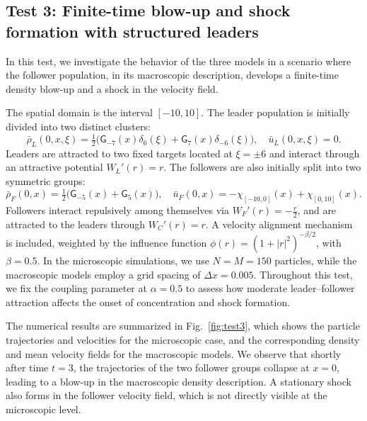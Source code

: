 \documentclass[10pt, reqno]{amsart}
\theoremstyle{definition}
\theoremstyle{remark}
\numberwithin{equation}{section}
\begin{document}
\subsection{Test 3: Finite-time blow-up and shock formation with structured leaders} 

In this test, we investigate the behavior of the three models in a scenario where the follower population, in its macroscopic description, develops a finite-time density blow-up and a shock in the velocity field.

The spatial domain is the interval $[-10, 10]$. The leader population is initially divided into two distinct clusters:
\[
\bar \rho_L(0,x,\xi) = \tfrac{1}{2}\Big(\mathsf{G}_{-7}(x)\delta_6(\xi) + \mathsf{G}_{7}(x)\delta_{-6}(\xi)\Big),
\quad
\bar u_L(0,x,\xi) = 0.
\]  Leaders are attracted to two fixed targets located at $\xi = \pm 6$ and interact through an attractive potential $W_L'(r) = r$. The followers are also initially split into two symmetric groups:
\[
\bar \rho_F(0,x) = \tfrac{1}{2}\Big(\mathsf{G}_{-5}(x) + \mathsf{G}_{5}(x)\Big), 
\quad
\bar u_F(0,x) = -\chi_{[-10,0]}(x)+\chi_{[0,10]}(x).
\] Followers interact repulsively among themselves via $W_F'(r) = -\tfrac{r}{2}$, and are attracted to the leaders through $W_C'(r) = r$. A velocity alignment mechanism is included, weighted by the influence function
\(
\phi(r) = \left(1 + |r|^2\right)^{-\beta/2}\), with $\beta = 0.5$. In the microscopic simulations, we use $N = M = 150$ particles, while the macroscopic models employ a grid spacing of $\Delta x = 0.005$.  
Throughout this test, we fix the coupling parameter at $\alpha = 0.5$ to assess how moderate leader–follower attraction affects the onset of concentration and shock formation.

The numerical results are summarized in Fig.~\ref{fig:test3}, which shows the particle trajectories and velocities for the microscopic case, and the corresponding density and mean velocity fields for the macroscopic models. We observe that shortly after time $t = 3$, the trajectories of the two follower groups collapse at $x = 0$, leading to a blow-up in the macroscopic density description. A stationary shock also forms in the follower velocity field, which is not directly visible at the microscopic level.
\end{document}
